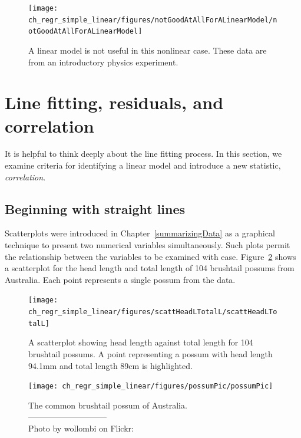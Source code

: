 \begin{figure}
   \centering
   \texttt{[image: ch\_regr\_simple\_linear/figures/notGoodAtAllForALinearModel/notGoodAtAllForALinearModel]}
   \caption{A linear model is not useful in this nonlinear case. These data are from an introductory physics experiment.}
   \label{notGoodAtAllForALinearModel}
\end{figure}


\section[Line fitting, residuals, and correlation]{Line fitting, residuals, and correlation }
\label{lineFittingResidualsCorrelation}

It is helpful to think deeply about the line fitting process. In this section, we examine criteria for identifying a linear model and introduce a new statistic, \emph{correlation}.

\subsection{Beginning with straight lines}


Scatterplots were introduced in Chapter~\ref{summarizingData} as a graphical technique to present two numerical variables simultaneously. Such plots permit the relationship between the variables to be examined with ease. Figure~\ref{scattHeadLTotalL} shows a scatterplot for the head length and total length of 104 brushtail possums from Australia. Each point represents a single possum from the data.

\begin{figure}
   \centering
   \texttt{[image: ch\_regr\_simple\_linear/figures/scattHeadLTotalL/scattHeadLTotalL]}
   \caption{A scatterplot showing head length against total length for 104 brushtail possums. A point representing a possum with head length 94.1mm and total length 89cm is highlighted.}
   \label{scattHeadLTotalL}
\end{figure}

\begin{figure}
   \centering
   \texttt{[image: ch\_regr\_simple\_linear/figures/possumPic/possumPic]}
   \caption{The common brushtail possum of Australia.\vspace{-1mm} \\
   -----------------------------\vspace{-2mm}\\
   {\footnotesize Photo by wollombi on Flickr: }\vspace{-8mm}}
   \label{possumPic}
\end{figure}

